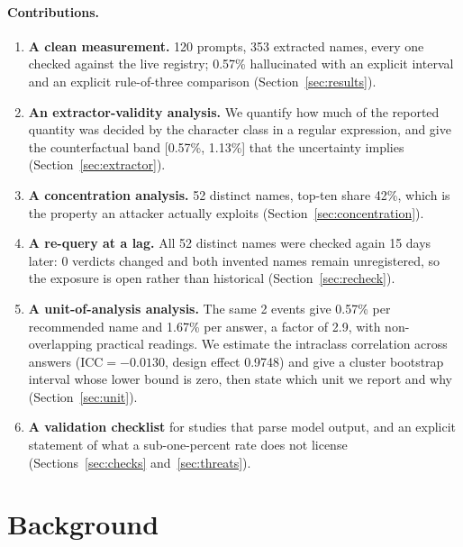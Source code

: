 \documentclass[journal]{IEEEtran}
\theoremstyle{definition}
\newcommand{\Nprompts}{120}
\newcommand{\Npkg}{353}
\newcommand{\Ndistinctpkg}{52}
\newcommand{\Nhall}{2}
\newcommand{\Rate}{0.57}
\newcommand{\CFlo}{0.57}
\newcommand{\CFhi}{1.13}
\newcommand{\Conc}{42}
\newcommand{\Recheckdays}{15}
\newcommand{\Recheckn}{52}
\newcommand{\Recheckflips}{0}
\newcommand{\UIcc}{-0.0130}
\newcommand{\UDeff}{0.9748}
\newcommand{\UPromptrate}{1.67}
\newcommand{\URatio}{2.9}
\begin{document}
\paragraph{Contributions.}
\begin{enumerate}
\item \textbf{A clean measurement.} \Nprompts{} prompts, \Npkg{} extracted
names, every one checked against the live registry;
\Rate\% hallucinated with an explicit interval and an explicit rule-of-three
comparison (Section~\ref{sec:results}).

\item \textbf{An extractor-validity analysis.} We quantify how much of the
reported quantity was decided by the character class in a regular expression,
and give the counterfactual band [\CFlo\%, \CFhi\%] that the uncertainty
implies (Section~\ref{sec:extractor}).

\item \textbf{A concentration analysis.} \Ndistinctpkg{} distinct names, top-ten
share \Conc\%, which is the property an attacker actually exploits
(Section~\ref{sec:concentration}).

\item \textbf{A re-query at a lag.} All \Recheckn{} distinct names were checked
again \Recheckdays{} days later: \Recheckflips{} verdicts changed and both
invented names remain unregistered, so the exposure is open rather than
historical (Section~\ref{sec:recheck}).

\item \textbf{A unit-of-analysis analysis.} The same \Nhall{} events give
\Rate\% per recommended name and \UPromptrate\% per answer, a factor of
\URatio, with non-overlapping practical readings. We estimate the intraclass
correlation across answers ($\mathrm{ICC} = \UIcc$, design effect \UDeff) and
give a cluster bootstrap interval whose lower bound is zero, then state which
unit we report and why (Section~\ref{sec:unit}).

\item \textbf{A validation checklist} for studies that parse model output, and
an explicit statement of what a sub-one-percent rate does not license
(Sections~\ref{sec:checks} and~\ref{sec:threats}).
\end{enumerate}

\section{Background}
\label{sec:background}
\end{document}
